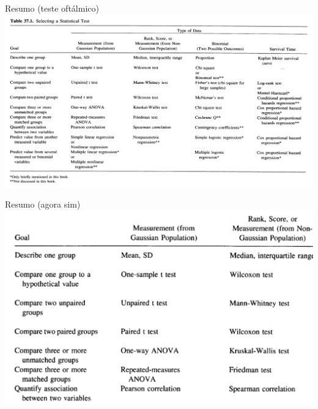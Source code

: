 \documentclass{beamer}
\begin{document}
\begin{frame}{Resumo (teste oftálmico)}
  \includegraphics[width=1.2\textwidth]{Cap37-38/metodos1}
\end{frame}

\begin{frame}{Resumo (agora sim)}
  \includegraphics[width=\textwidth]{Cap37-38/metodos2}
\end{frame}
\end{document}
